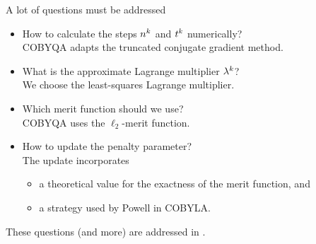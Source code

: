 \documentclass[
]{presentation}
\newcommand{\lm}[1][]{\lambda\ifblank{#1}{}{^{#1}}}
\newcommand{\nstep}[1][]{n\ifblank{#1}{}{^{#1}}}
\newcommand{\tstep}[1][]{t\ifblank{#1}{}{^{#1}}}
\begin{document}
\begin{frame}{A lot of questions must be addressed}
    \begin{itemize}
        \item How to calculate the steps $\nstep[k]$ and $\tstep[k]$ numerically?\\
        \textcolor{FernGreen}{COBYQA adapts the truncated conjugate gradient method.}
        \item What is the approximate Lagrange multiplier $\lm[k]$?\\
        \textcolor{FernGreen}{We choose the least-squares Lagrange multiplier.}
        \item Which merit function should we use?\\
        \textcolor{FernGreen}{COBYQA uses the $\ell_2$-merit function.}
        \item How to update the penalty parameter?\\
        \textcolor{FernGreen}{The update incorporates}
        \begin{itemize}
            \item \textcolor{FernGreen}{a theoretical value for the exactness of the merit function, and}
            \item \textcolor{FernGreen}{a strategy used by Powell in COBYLA.}
        \end{itemize}
    \end{itemize}

    \bigskip

    These questions (and more) are addressed in \textcite{Ragonneau_2022}.
\end{frame}
\end{document}
